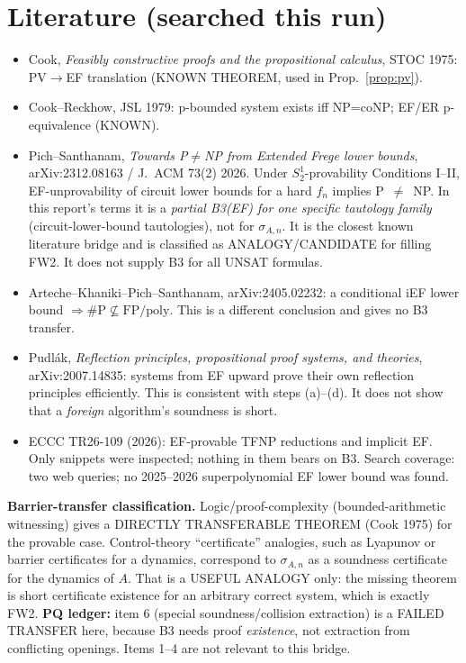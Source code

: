 \documentclass[11pt]{article}
\begin{document}
\section{Literature (searched this run)}
\begin{itemize}
\item Cook, \emph{Feasibly constructive proofs and the propositional calculus},
STOC 1975: PV$\to$EF translation (KNOWN THEOREM, used in Prop.~\ref{prop:pv}).
\item Cook--Reckhow, JSL 1979: p-bounded system exists iff NP=coNP; EF/ER
p-equivalence (KNOWN).
\item Pich--Santhanam, \emph{Towards P$\neq$NP from Extended Frege lower bounds},
arXiv:2312.08163 / J.~ACM 73(2) 2026. Under $S^1_2$-provability Conditions I--II,
EF-unprovability of circuit lower bounds for a hard $f_n$ implies P~$\neq$~NP.
In this report's terms it is a \emph{partial B3(EF) for one specific tautology
family} (circuit-lower-bound tautologies), not for $\sigma_{A,n}$. It is the
closest known literature bridge and is classified as ANALOGY/CANDIDATE for
filling FW2. It does not supply B3 for all UNSAT formulas.
\item Arteche--Khaniki--Pich--Santhanam, arXiv:2405.02232: a conditional iEF lower
bound $\Rightarrow\#\mathrm P\not\subseteq\mathrm{FP/poly}$. This is a different
conclusion and gives no B3 transfer.
\item Pudl\'ak, \emph{Reflection principles, propositional proof systems, and
theories}, arXiv:2007.14835: systems from EF upward prove their own reflection
principles efficiently. This is consistent with steps (a)--(d). It does not show
that a \emph{foreign} algorithm's soundness is short.
\item ECCC TR26-109 (2026): EF-provable TFNP reductions and implicit EF. Only
snippets were inspected; nothing in them bears on B3. Search coverage: two web
queries; no 2025--2026 superpolynomial EF lower bound was found.
\end{itemize}
\textbf{Barrier-transfer classification.} Logic/proof-complexity
(bounded-arithmetic witnessing) gives a DIRECTLY TRANSFERABLE THEOREM (Cook
1975) for the provable case. Control-theory ``certificate'' analogies, such as
Lyapunov or barrier certificates for a dynamics, correspond to $\sigma_{A,n}$ as
a soundness certificate for the dynamics of $A$. That is a USEFUL ANALOGY only:
the missing theorem is short certificate existence for an arbitrary correct
system, which is exactly FW2. \textbf{PQ ledger:} item 6 (special
soundness/collision extraction) is a FAILED TRANSFER here, because B3 needs
proof \emph{existence}, not extraction from conflicting openings. Items 1--4 are
not relevant to this bridge.
\end{document}
